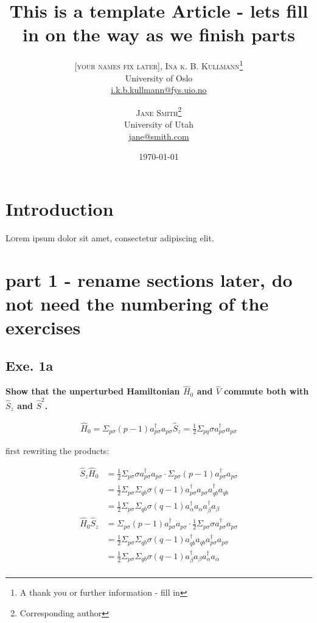 \documentclass[twoside,twocolumn]{article}
\title{This is a template Article - lets fill in on the way as we finish parts} %
\author{%
\textsc{[your names fix later], Ina k. B. Kullmann}\thanks{A thank you or further information - fill in} \\[1ex] %
\normalsize University of Oslo \\ %
\normalsize \href{mailto:i.k.b.kullmann@fys.uio.no}{i.k.b.kullmann@fys.uio.no} %
\and %
\textsc{Jane Smith}\thanks{Corresponding author} \\[1ex] %
\normalsize University of Utah \\ %
\normalsize \href{mailto:jane@smith.com}{jane@smith.com} %
}
\date{\today} %
\begin{document}
\maketitle


\section{Introduction}

\lettrine[nindent=0em,lines=3]{L} orem ipsum dolor sit amet, consectetur adipiscing elit.
\blindtext %

\blindtext %


\section{part 1 - rename sections later, do not need the numbering of the exercises}
\subsection{ Exe. 1a}

\textbf{Show that the unperturbed Hamiltonian $\hat{H}_0$ and $\hat{V}$ commute both with $\hat{S}_z$ and $\hat{S}^2$. }

\begin{align*}
\hat{H}_0 = \Sigma_{p\sigma} (p-1) a_{p\sigma}^\dagger a_{p\sigma}
\hat{S}_z = \frac{1}{2} \Sigma_{pq} \sigma a_{p\sigma}^\dagger a_{p\sigma}
\end{align*}

first rewriting the products: 

\begin{align*}
\hat{S}_z \hat{H}_0 &= \frac{1}{2} \Sigma_{p\sigma} \sigma a_{p\sigma}^\dagger a_{p\sigma} \cdot  \Sigma_{p\sigma} (p-1) a_{p\sigma}^\dagger a_{p\sigma} \\
&= \frac{1}{2} \Sigma_{p\sigma}  \Sigma_{qb} \sigma (q-1) a_{p\sigma}^\dagger a_{p\sigma}  a_{qb}^\dagger a_{qb} \\
&= \frac{1}{2} \Sigma_{p\sigma}  \Sigma_{qb} \sigma (q-1) a_\alpha^\dagger a_\alpha  a_\beta^\dagger a_\beta \\
\hat{H}_0 \hat{S}_z  &= \Sigma_{p\sigma} (p-1) a_{p\sigma}^\dagger a_{p\sigma} \cdot  \frac{1}{2} \Sigma_{p\sigma} \sigma a_{p\sigma}^\dagger a_{p\sigma} \\
&= \frac{1}{2} \Sigma_{p\sigma}  \Sigma_{qb} \sigma (q-1) a_{qb}^\dagger a_{qb} a_{p\sigma}^\dagger a_{p\sigma} \\
&= \frac{1}{2} \Sigma_{p\sigma}  \Sigma_{qb} \sigma (q-1) a_\beta^\dagger a_\beta a_\alpha^\dagger a_\alpha \\
\end{align*}
\end{document}
